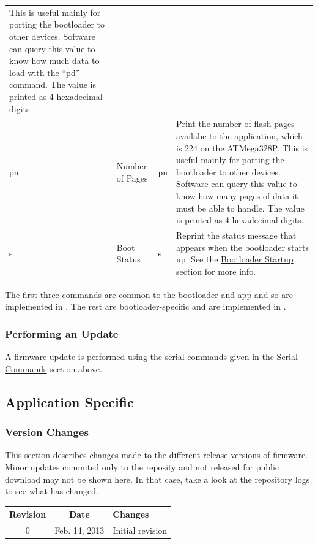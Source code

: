 \documentclass{article}
\begin{document}
\begin{longtable}{l|l|p{}|p{}}
    This is useful mainly for porting the bootloader to other devices.  Software can query this
    value to know how much data to load with the ``pd'' command.  The value is printed as 4
    hexadecimal digits.  \\
    pn & Number of Pages & pn & Print the number of flash pages availabe to the application,
    which is 224 on the ATMega328P.  This is useful mainly for porting the bootloader to other
    devices.  Software can query this value to know how many pages of data it must be able to
    handle.  The value is printed as 4 hexadecimal digits. \\
    s & Boot Status & s & Reprint the status message that appears when the bootloader starts
    up.  See the \hyperref[sssec:FWBootStartup]{Bootloader Startup} section for more info. \\
\end{longtable}

The first three commands are common to the bootloader and app and so are implemented in
.  The rest are bootloader-specific and are implemented in
.

\subsubsection{Performing an Update} \label{sssec:FWBootUpdate}
A firmware update is performed using the serial commands given in the
\hyperref[sssec:FWBootCommands]{Serial Commands} section above.

\subsection{Application Specific} \label{ssec:FWApplication}

\subsubsection{Version Changes} \label{sssec:FWAppChanges}
This section describes changes made to the different release versions of firmware.  Minor updates
commited only to the reposity and not released for public download may not be shown here.  In that
case, take a look at the repository logs to see what has changed.

\begin{center}
    \begin{tabular}{c|c|p{}}
        Revision & Date & Changes \\
        \hline
        0 & Feb. 14, 2013 & Initial revision \\
    \end{tabular}
\end{center}
\end{document}
